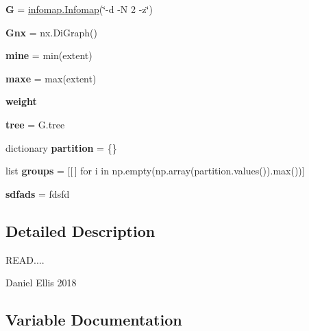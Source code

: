 \begin{DoxyCompactItemize}
{\bfseries G} = \mbox{\hyperlink{classinfomap_1_1Infomap}{infomap.\+Infomap}}(\char`\"{}-\/d -\/N 2 -\/z\char`\"{})
\item 
\mbox{\label{namespacez__infomap__revert_a8fe365b2bbb77a4d839d185984af0fd7}} 
{\bfseries Gnx} = nx.\+Di\+Graph()
\item 
\mbox{\label{namespacez__infomap__revert_aa97e5ba6e821736bfb18e0699ac8a5d6}} 
{\bfseries mine} = min(extent)
\item 
\mbox{\label{namespacez__infomap__revert_a67cb3f03ab89d739cd957548bc9db28f}} 
{\bfseries maxe} = max(extent)
\item 
\mbox{\label{namespacez__infomap__revert_a5dcde3e6b17225a91ecce358163ea07e}} 
{\bfseries weight}
\item 
\mbox{\label{namespacez__infomap__revert_a61d5792978cbb0855cb75ab5e1b33c88}} 
{\bfseries tree} = G.\+tree
\item 
\mbox{\label{namespacez__infomap__revert_a60af258757dddb8b505a27c33e65cd41}} 
dictionary {\bfseries partition} = \{\}
\item 
\mbox{\label{namespacez__infomap__revert_a48aa8830f2fa5d904c3125e14a87f251}} 
list {\bfseries groups} = \mbox{[}\mbox{[}$\,$\mbox{]} for i in np.\+empty(np.\+array(partition.\+values()).max())\mbox{]}
\item 
\mbox{\label{namespacez__infomap__revert_a1fc16dd3398a0569317836ea1064e8f1}} 
{\bfseries sdfads} = fdsfd
\end{DoxyCompactItemize}


\subsection{Detailed Description}
\begin{DoxyVerb}READ....

Daniel Ellis 2018
\end{DoxyVerb}
 

\subsection{Variable Documentation}
\mbox{\label{namespacez__infomap__revert_a897168f28801206de8850a65c6160df9}} 
